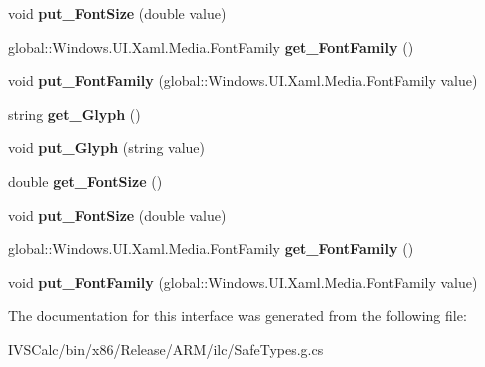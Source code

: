 \begin{DoxyCompactItemize}
void {\bfseries put\+\_\+\+Font\+Size} (double value)
\item 
\mbox{\label{interface_windows_1_1_u_i_1_1_xaml_1_1_controls_1_1_i_font_icon_a9a70a7f083b2528d375f3a8262aae382}} 
global\+::\+Windows.\+U\+I.\+Xaml.\+Media.\+Font\+Family {\bfseries get\+\_\+\+Font\+Family} ()
\item 
\mbox{\label{interface_windows_1_1_u_i_1_1_xaml_1_1_controls_1_1_i_font_icon_ac80bf98a4d031b00224048236e74f7a1}} 
void {\bfseries put\+\_\+\+Font\+Family} (global\+::\+Windows.\+U\+I.\+Xaml.\+Media.\+Font\+Family value)
\item 
\mbox{\label{interface_windows_1_1_u_i_1_1_xaml_1_1_controls_1_1_i_font_icon_a7b89ee1452fbf6add71574383ec042ad}} 
string {\bfseries get\+\_\+\+Glyph} ()
\item 
\mbox{\label{interface_windows_1_1_u_i_1_1_xaml_1_1_controls_1_1_i_font_icon_a286f89cdc8e53df9aaa1bcae6107ea9f}} 
void {\bfseries put\+\_\+\+Glyph} (string value)
\item 
\mbox{\label{interface_windows_1_1_u_i_1_1_xaml_1_1_controls_1_1_i_font_icon_ab38ce1dfd80b0b587d2104020f6af58f}} 
double {\bfseries get\+\_\+\+Font\+Size} ()
\item 
\mbox{\label{interface_windows_1_1_u_i_1_1_xaml_1_1_controls_1_1_i_font_icon_ae3677531a4f648e82404282b2852bf18}} 
void {\bfseries put\+\_\+\+Font\+Size} (double value)
\item 
\mbox{\label{interface_windows_1_1_u_i_1_1_xaml_1_1_controls_1_1_i_font_icon_a9a70a7f083b2528d375f3a8262aae382}} 
global\+::\+Windows.\+U\+I.\+Xaml.\+Media.\+Font\+Family {\bfseries get\+\_\+\+Font\+Family} ()
\item 
\mbox{\label{interface_windows_1_1_u_i_1_1_xaml_1_1_controls_1_1_i_font_icon_ac80bf98a4d031b00224048236e74f7a1}} 
void {\bfseries put\+\_\+\+Font\+Family} (global\+::\+Windows.\+U\+I.\+Xaml.\+Media.\+Font\+Family value)
\end{DoxyCompactItemize}


The documentation for this interface was generated from the following file\+:\begin{DoxyCompactItemize}
\item 
I\+V\+S\+Calc/bin/x86/\+Release/\+A\+R\+M/ilc/Safe\+Types.\+g.\+cs\end{DoxyCompactItemize}
